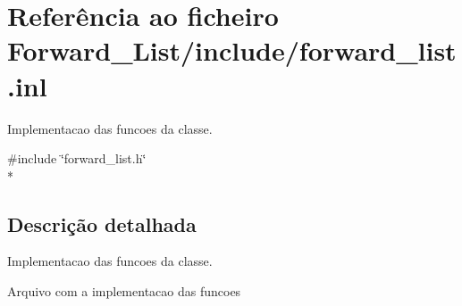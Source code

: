 \hypertarget{forward__list_8inl}{}\section{Referência ao ficheiro Forward\+\_\+\+List/include/forward\+\_\+list.inl}
\label{forward__list_8inl}


Implementacao das funcoes da classe.  


{\ttfamily \#include \char`\"{}forward\+\_\+list.\+h\char`\"{}}\\*


\subsection{Descrição detalhada}
Implementacao das funcoes da classe. 

Arquivo com a implementacao das funcoes 